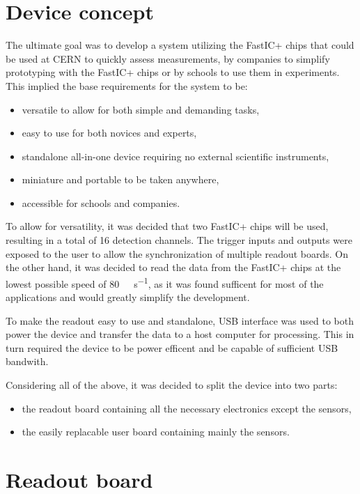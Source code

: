 
\chapter{Device concept}
The ultimate goal was to develop a system utilizing the FastIC+ chips that could be used at CERN to quickly assess measurements, by companies to simplify prototyping with the FastIC+ chips or by schools to use them in experiments. This implied the base requirements for the system to be:
\begin{itemize}
    \item versatile to allow for both simple and demanding tasks,
    \item easy to use for both novices and experts,
    \item standalone all-in-one device requiring no external scientific instruments,
    \item miniature and portable to be taken anywhere,
    \item accessible for schools and companies.
\end{itemize}

To allow for versatility, it was decided that two FastIC+ chips will be used, resulting in a total of 16 detection channels. The trigger inputs and outputs were exposed to the user to allow the synchronization of multiple readout boards. On the other hand, it was decided to read the data from the FastIC+ chips at the lowest possible speed of \SI{80}{\mega\bit\per\second}, as it was found sufficent for most of the applications and would greatly simplify the development.

To make the readout easy to use and standalone, USB interface was used to both power the device and transfer the data to a host computer for processing. This in turn required the device to be power efficent and be capable of sufficient USB bandwith.

Considering all of the above, it was decided to split the device into two parts: 
\begin{itemize}
    \item the readout board containing all the necessary electronics except the sensors,
    \item the easily replacable user board containing mainly the sensors.
\end{itemize}

\chapter{Readout board}

